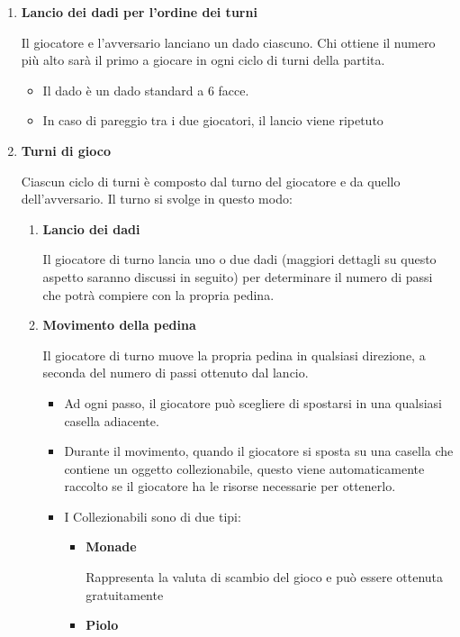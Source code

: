 \begin{enumerate}
    \item \textbf{Lancio dei dadi per l'ordine dei turni}\par
    Il giocatore e l'avversario lanciano un dado ciascuno. Chi ottiene
    il numero più alto sarà il primo a giocare in ogni ciclo di turni della partita.
    \begin{itemize}
        \item Il dado è un dado standard a 6 facce.
        \item In caso di pareggio tra i due giocatori, il lancio viene ripetuto
    \end{itemize}
    \item \textbf{Turni di gioco}\par
    Ciascun ciclo di turni è composto dal turno del giocatore e da quello dell'avversario.
    Il turno si svolge in questo modo:
    \begin{enumerate}
        \item \textbf{Lancio dei dadi}\par
        Il giocatore di turno lancia uno o due dadi 
        (maggiori dettagli su questo aspetto saranno 
        discussi in seguito) per determinare il numero di passi
        che potrà compiere con la propria pedina.
        \item \textbf{Movimento della pedina}\par
        Il giocatore di turno muove la propria pedina in qualsiasi
        direzione, a seconda del numero di passi ottenuto dal lancio.
        \begin{itemize}
            \item Ad ogni passo, il giocatore può scegliere di spostarsi
            in una qualsiasi casella adiacente.
            \item Durante il movimento, quando il giocatore si sposta
            su una casella che contiene un oggetto collezionabile, 
            questo viene automaticamente raccolto se il giocatore ha
            le risorse necessarie per ottenerlo.
            \item I Collezionabili sono di due tipi:
            \begin{itemize}
                \item \textbf{Monade}\par
                Rappresenta la valuta di scambio del gioco e può essere ottenuta gratuitamente
                \item \textbf{Piolo}\par

\end{itemize}
\end{itemize}
\end{enumerate}
\end{enumerate}
